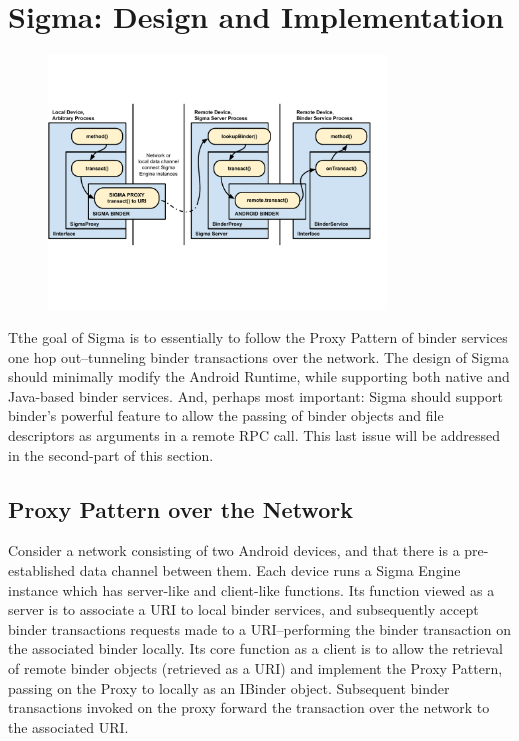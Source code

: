 \documentclass[prodmode]{acmlarge}
\begin{document}
\section{Sigma: Design and Implementation}
\begin{figure}[h]
\centering
\includegraphics[width=0.8\textwidth]{drawings/sigma_proxy_pattern.pdf}
\end{figure}
Tthe goal of Sigma is to essentially to follow the Proxy Pattern of binder services one hop out--tunneling binder transactions over the network. The design of Sigma should minimally modify the Android Runtime, while supporting both native and Java-based binder services. And, perhaps most important: Sigma should support binder's powerful feature to allow the passing of binder objects and file descriptors as arguments in a remote RPC call. This last issue will be addressed in the second-part of this section.

\subsection{Proxy Pattern over the Network}

Consider a network consisting of two Android devices, and that there is a pre-established data channel between them. Each device runs a Sigma Engine instance which has server-like and client-like functions. Its function viewed as a server is to associate a URI to local binder services, and subsequently accept binder transactions requests made to a URI--performing the binder transaction on the associated binder locally. Its core function as a client is to allow the retrieval of remote binder objects (retrieved as a URI) and implement the Proxy Pattern, passing on the Proxy to locally as an IBinder object. Subsequent binder transactions invoked on the proxy forward the transaction over the network to the associated URI.
\end{document}
